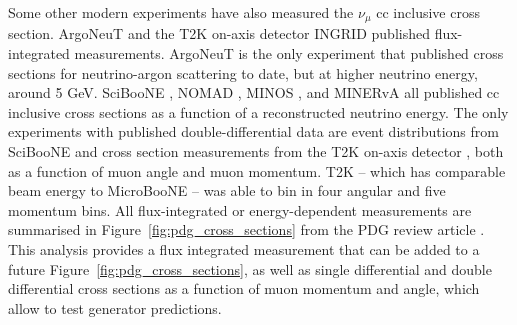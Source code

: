 Some other modern experiments 
have also measured the $\nu_\mu$ \acrshort{cc} inclusive cross section. ArgoNeuT \cite{ArgoNeuTCCincl, ArgoNeuTCCincl2} and the T2K on-axis detector INGRID \cite{T2KCCinclINGRID,T2KCCinclINGRID2} published flux-integrated measurements. ArgoNeuT is the only experiment that published cross sections for neutrino-argon scattering to date, but at higher neutrino energy, around 5 GeV. SciBooNE \cite{SciBooNECCincl}, NOMAD \cite{NOMADCCincl}, MINOS \cite{MINOSCCincl}, and MINERvA \cite{MINERvACCincl,MINERvACCincl2} all published \acrshort{cc} inclusive cross sections as a function of a reconstructed neutrino energy. The only experiments with published double-differential data are event distributions from SciBooNE \cite{SciBooNECCincl} and cross section measurements from the T2K on-axis detector \cite{T2KCCinclND280}, both as a function of muon angle and muon momentum. T2K -- which has comparable beam energy to MicroBooNE -- was able to bin in four angular and five momentum bins. All flux-integrated or energy-dependent measurements are summarised in Figure~\ref{fig:pdg_cross_sections} from the PDG review article \cite{PDGReview}. This analysis provides a flux integrated measurement that can be added to a future Figure~\ref{fig:pdg_cross_sections}, as well as single differential and double differential cross sections as a function of muon momentum and angle, which allow to test generator predictions.


